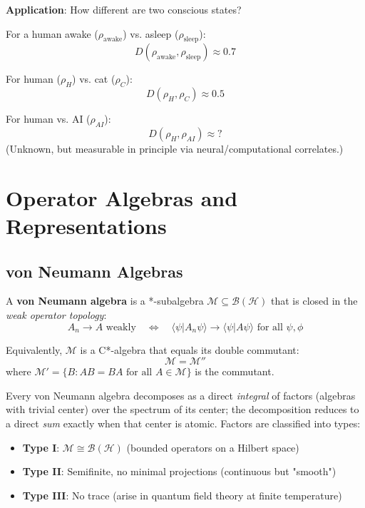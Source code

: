 \textbf{Application}: How different are two conscious states?

For a human awake ($\rho_{\text{awake}}$) vs. asleep ($\rho_{\text{sleep}}$):
\begin{equation}
D(\rho_{\text{awake}}, \rho_{\text{sleep}}) \approx 0.7
\end{equation}

For human ($\rho_H$) vs. cat ($\rho_C$):
\begin{equation}
D(\rho_H, \rho_C) \approx 0.5
\end{equation}

For human vs. AI ($\rho_{AI}$):
\begin{equation}
D(\rho_H, \rho_{AI}) \approx ?
\end{equation}
(Unknown, but measurable in principle via neural/computational correlates.)

\section{Operator Algebras and Representations}

\subsection{von Neumann Algebras}

\begin{definition}\label{def:von-neumann-algebra}
A \textbf{von Neumann algebra} is a *-subalgebra $\mathcal{M} \subseteq \mathcal{B}(\mathcal{H})$ that is closed in the \textit{weak operator topology}:
\begin{equation}
A_n \to A \text{ weakly} \quad \Leftrightarrow \quad \langle \psi | A_n\psi \rangle \to \langle \psi | A\psi \rangle \text{ for all } \psi, \phi
\end{equation}

Equivalently, $\mathcal{M}$ is a C*-algebra that equals its double commutant:
\begin{equation}
\mathcal{M} = \mathcal{M}''
\end{equation}
where $\mathcal{M}' = \{B : AB = BA \text{ for all } A \in \mathcal{M}\}$ is the commutant.
\end{definition}

\begin{theorem}\label{thm:von-neumann-classification}
Every von Neumann algebra decomposes as a direct \emph{integral} of factors
(algebras with trivial center) over the spectrum of its center; the decomposition
reduces to a direct \emph{sum} exactly when that center is atomic. Factors are
classified into types:
\begin{itemize}
\item \textbf{Type I}: $\mathcal{M} \cong \mathcal{B}(\mathcal{H})$ (bounded operators on a Hilbert space)
\item \textbf{Type II}: Semifinite, no minimal projections (continuous but "smooth")
\item \textbf{Type III}: No trace (arise in quantum field theory at finite temperature)
\end{itemize}
\end{theorem}

